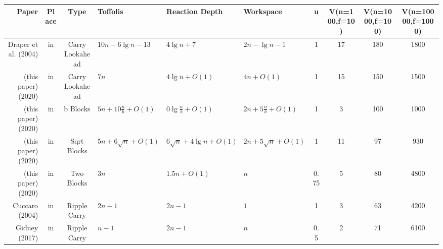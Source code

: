 \begin{tabular}{r|c|c|l|l|l|c|c|c|c}
Paper                                                &Place &Type                   &Toffolis                    &Reaction Depth             &Workspace                  &u    &V(n=100,f=10) &V(n=1000,f=100) &V(n=10000,f=1000) \\
\hline
Draper et al. (2004) \cite{draper2004lookaheadadder} &in    &Carry Lookahead        &$10n - 6\lg n - 13$         &$4\lg n + 7$               &$2n - \lg n - 1$           &1    &17            &180             &1800              \\
(this paper) (2020)                                  &in    &Carry Lookahead        &$7n$                        &$4\lg n + O(1)$            &$4n + O(1)$                &1    &15            &150             &1500              \\
(this paper) (2020)                                  &in    &b Blocks               &$5n + 10\frac{n}{b} + O(1)$ &$0\lg \frac{n}{b} + O(1)$  &$2n + 5\frac{n}{b} + O(1)$ &1    &3             &100             &1000              \\
(this paper) (2020)                                  &in    &Sqrt Blocks            &$5n + 6\sqrt n + O(1)$      &$6\sqrt n + 4\lg n + O(1)$ &$2n + 5\sqrt n + O(1)$     &1    &11            &97              &930               \\
(this paper) (2020)                                  &in    &Two Blocks             &$3n$                        &$1.5n + O(1)$              &$n$                        &0.75 &5             &80              &4800              \\
Cuccaro (2004) \cite{cuccaro2004adder}               &in    &Ripple Carry           &$2n - 1$                    &$2n - 1$                   &$1$                        &1    &3             &63              &4200              \\
Gidney (2017) \cite{gidney2018halving}               &in    &Ripple Carry           &$n - 1$                     &$2n - 1$                   &$n$                        &0.5  &2             &71              &6100              \\


\end{tabular}
